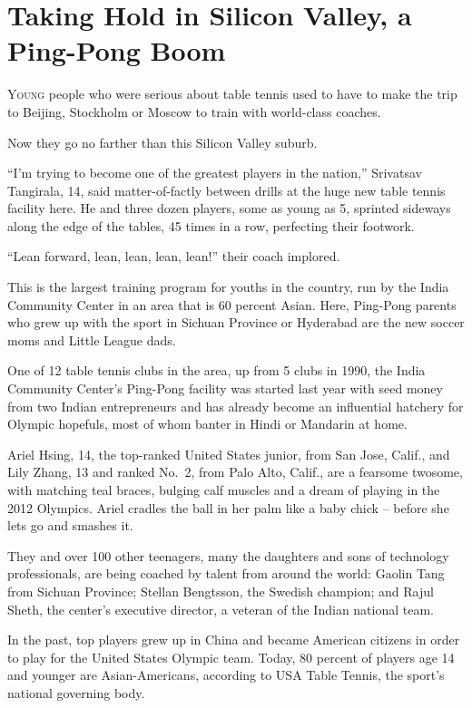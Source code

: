 ﻿\documentclass[12pt]{article}
\begin{document}
\section{Taking Hold in Silicon Valley, a Ping-Pong Boom}

\lettrine{Y}{oung} people who were serious about table tennis used to have
to make the trip to Beijing, Stockholm or Moscow to train with world-class coaches.

Now they go no farther than this Silicon Valley suburb.

``I'm trying to become one of the greatest players in the nation,'' Srivatsav Tangirala, 14, said
matter-of-factly between drills at the huge new table tennis facility here. He and three dozen
players, some as young as 5, sprinted sideways along the edge of the tables, 45 times in a row,
perfecting their footwork.

``Lean forward, lean, lean, lean, lean!'' their coach implored.

This is the largest training program for youths in the country, run by the India Community Center in
an area that is 60 percent Asian. Here, Ping-Pong parents who grew up with the sport in Sichuan
Province or Hyderabad are the new soccer moms and Little League dads.

One of 12 table tennis clubs in the area, up from 5 clubs in 1990, the India Community Center's
Ping-Pong facility was started last year with seed money from two Indian entrepreneurs and has
already become an influential hatchery for Olympic hopefuls, most of whom banter in Hindi or
Mandarin at home.

Ariel Hsing, 14, the top-ranked United States junior, from San Jose, Calif., and Lily Zhang, 13 and
ranked No.~2, from Palo Alto, Calif., are a fearsome twosome, with matching teal braces, bulging
calf muscles and a dream of playing in the 2012 Olympics. Ariel cradles the ball in her palm like a
baby chick -- before she lets go and smashes it.

They and over 100 other teenagers, many the daughters and sons of technology professionals, are
being coached by talent from around the world: Gaolin Tang from Sichuan Province; Stellan Bengtsson,
the Swedish champion; and Rajul Sheth, the center's executive director, a veteran of the Indian
national team.

In the past, top players grew up in China and became American citizens in order to play for the
United States Olympic team. Today, 80 percent of players age 14 and younger are Asian-Americans,
according to USA Table Tennis, the sport's national governing body.
\end{document}
